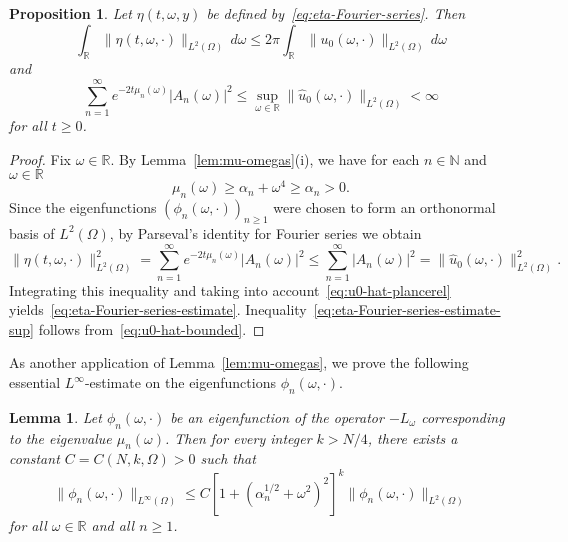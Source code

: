 \documentclass[a4paper, reqno,titlepage]{amsart}
\numberwithin{equation}{section}
\theoremstyle{plain}
\newtheorem{proposition}[theorem]{Proposition}
\newtheorem{lemma}[theorem]{Lemma}
\theoremstyle{definition}
\theoremstyle{remark}
\newcommand{\NN}{\mathbb{N}}
\newcommand{\RR}{\mathbb{R}}
\begin{document}
\begin{proposition}
  \label{prop:eta-series}
  Let $\eta(t, \omega, y)$ be defined by~\eqref{eq:eta-Fourier-series}. Then
  \begin{equation}
    \label{eq:eta-Fourier-series-estimate}
    \int_\RR \| \eta(t, \omega, \cdot) \|_{L^2(\Omega)} \,d\omega
    \leq 2\pi\int_{\RR}\|u_0(\omega,\cdot)\|_{L^2(\Omega)}\,d\omega
  \end{equation}
  and
  \begin{equation}
    \label{eq:eta-Fourier-series-estimate-sup}
    \sum_{n=1}^\infty e^{-2t\mu_n(\omega)} |A_n(\omega)|^2
    \leq \sup_{\omega\in\RR}\|\widehat{u}_0(\omega,\cdot)\|_{L^2(\Omega)}<\infty
  \end{equation}
  for all $t\geq 0$.
\end{proposition}
\begin{proof}
  Fix $\omega \in \RR$. By Lemma~\ref{lem:mu-omegas}(i), we have for each $n \in \NN$ and $\omega\in\RR$
  \begin{equation*}
    \mu_n(\omega) \ge \alpha_n + \omega^4\geq \alpha_n>0.
  \end{equation*}
  Since the eigenfunctions $(\phi_n(\omega, \cdot))_{n \ge 1}$ were chosen to form an orthonormal basis of $L^2(\Omega)$, by Parseval's identity for Fourier series we obtain
  \begin{equation*}
    \label{eq:eta-series1}
    \| \eta(t, \omega, \cdot) \|_{L^2(\Omega)}^2
    =\sum_{n=1}^\infty e^{-2t\mu_n(\omega)} |A_n(\omega)|^2
    \leq\sum_{n=1}^\infty |A_n(\omega)|^2
    =\|\widehat{u}_0(\omega,\cdot)\|^2_{L^2(\Omega)}.
  \end{equation*}
  Integrating this inequality and taking into account~\eqref{eq:u0-hat-plancerel} yields~\eqref{eq:eta-Fourier-series-estimate}. Inequality~\eqref{eq:eta-Fourier-series-estimate-sup} follows from~\eqref{eq:u0-hat-bounded}.
\end{proof}

As another application of Lemma~\ref{lem:mu-omegas}, we prove the following essential $L^\infty$-estimate on the eigenfunctions $\phi_n(\omega,\cdot)$.
\begin{lemma}
  \label{lem:supnorm}
  Let $\phi_n(\omega, \cdot)$ be an eigenfunction of the operator $-L_\omega$ corresponding to the eigenvalue $\mu_n(\omega)$. Then for every integer $k>N/4$, there exists a constant $C = C(N, k, \Omega) > 0$ such that
  \begin{equation}
    \label{eq:supnorm}
    \| \phi_n(\omega, \cdot) \|_{L^\infty(\Omega)}
    \leq C \left[1+(\alpha_n^{1/2}+\omega^2)^2\right]^k\|\phi_n(\omega,\cdot)\|_{L^2(\Omega)}
  \end{equation}
  for all $\omega\in\RR$ and all $n \ge 1$.
\end{lemma}
\end{document}
